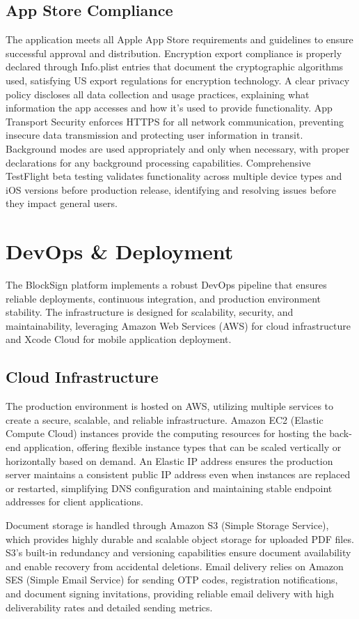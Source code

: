 \subsection{App Store Compliance}
The application meets all Apple App Store requirements and guidelines to ensure successful approval and distribution. Encryption export compliance is properly declared through Info.plist entries that document the cryptographic algorithms used, satisfying US export regulations for encryption technology. A clear privacy policy discloses all data collection and usage practices, explaining what information the app accesses and how it's used to provide functionality. App Transport Security enforces HTTPS for all network communication, preventing insecure data transmission and protecting user information in transit. Background modes are used appropriately and only when necessary, with proper declarations for any background processing capabilities. Comprehensive TestFlight beta testing validates functionality across multiple device types and iOS versions before production release, identifying and resolving issues before they impact general users.

\section{DevOps \& Deployment}
The BlockSign platform implements a robust DevOps pipeline that ensures reliable deployments, continuous integration, and production environment stability. The infrastructure is designed for scalability, security, and maintainability, leveraging Amazon Web Services (AWS) for cloud infrastructure and Xcode Cloud for mobile application deployment.

\subsection{Cloud Infrastructure}
The production environment is hosted on AWS, utilizing multiple services to create a secure, scalable, and reliable infrastructure. Amazon EC2 (Elastic Compute Cloud) instances provide the computing resources for hosting the back-end application, offering flexible instance types that can be scaled vertically or horizontally based on demand. An Elastic IP address ensures the production server maintains a consistent public IP address even when instances are replaced or restarted, simplifying DNS configuration and maintaining stable endpoint addresses for client applications.

Document storage is handled through Amazon S3 (Simple Storage Service), which provides highly durable and scalable object storage for uploaded PDF files. S3's built-in redundancy and versioning capabilities ensure document availability and enable recovery from accidental deletions. Email delivery relies on Amazon SES (Simple Email Service) for sending OTP codes, registration notifications, and document signing invitations, providing reliable email delivery with high deliverability rates and detailed sending metrics.

